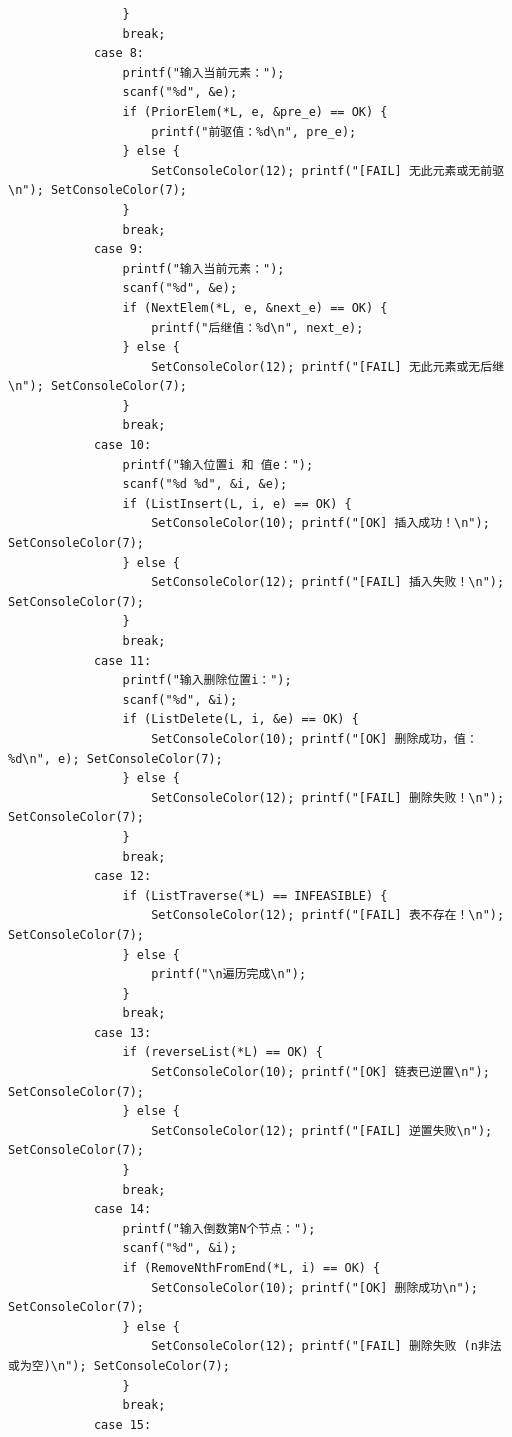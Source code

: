 \documentclass[supercite]{Experimental_Report}
\begin{document}
{\begin{lstlisting}
                }
                break;
            case 8:
                printf("输入当前元素：");
                scanf("%d", &e);
                if (PriorElem(*L, e, &pre_e) == OK) {
                    printf("前驱值：%d\n", pre_e);
                } else {
                    SetConsoleColor(12); printf("[FAIL] 无此元素或无前驱\n"); SetConsoleColor(7);
                }
                break;
            case 9:
                printf("输入当前元素：");
                scanf("%d", &e);
                if (NextElem(*L, e, &next_e) == OK) {
                    printf("后继值：%d\n", next_e);
                } else {
                    SetConsoleColor(12); printf("[FAIL] 无此元素或无后继\n"); SetConsoleColor(7);
                }
                break;
            case 10:
                printf("输入位置i 和 值e：");
                scanf("%d %d", &i, &e);
                if (ListInsert(L, i, e) == OK) {
                    SetConsoleColor(10); printf("[OK] 插入成功！\n"); SetConsoleColor(7);
                } else {
                    SetConsoleColor(12); printf("[FAIL] 插入失败！\n"); SetConsoleColor(7);
                }
                break;
            case 11:
                printf("输入删除位置i：");
                scanf("%d", &i);
                if (ListDelete(L, i, &e) == OK) {
                    SetConsoleColor(10); printf("[OK] 删除成功，值：%d\n", e); SetConsoleColor(7);
                } else {
                    SetConsoleColor(12); printf("[FAIL] 删除失败！\n"); SetConsoleColor(7);
                }
                break;
            case 12:
                if (ListTraverse(*L) == INFEASIBLE) {
                    SetConsoleColor(12); printf("[FAIL] 表不存在！\n"); SetConsoleColor(7);
                } else {
                    printf("\n遍历完成\n");
                }
                break;
            case 13:
                if (reverseList(*L) == OK) {
                    SetConsoleColor(10); printf("[OK] 链表已逆置\n"); SetConsoleColor(7);
                } else {
                    SetConsoleColor(12); printf("[FAIL] 逆置失败\n"); SetConsoleColor(7);
                }
                break;
            case 14:
                printf("输入倒数第N个节点：");
                scanf("%d", &i);
                if (RemoveNthFromEnd(*L, i) == OK) {
                    SetConsoleColor(10); printf("[OK] 删除成功\n"); SetConsoleColor(7);
                } else {
                    SetConsoleColor(12); printf("[FAIL] 删除失败 (n非法或为空)\n"); SetConsoleColor(7);
                }
                break;
            case 15:

\end{lstlisting}}
\end{document}
